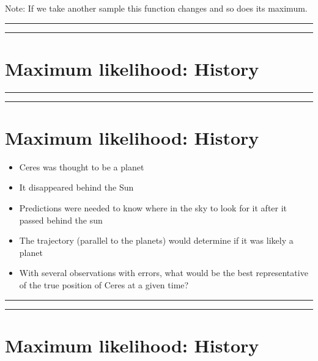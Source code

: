 \documentclass[
]{book}
\begin{document}
Note: If we take another sample this function changes and so does its maximum.

\begin{center}\rule{0.5\linewidth}{0.5pt}\end{center}

\begin{center}\rule{0.5\linewidth}{0.5pt}\end{center}

\hypertarget{maximum-likelihood-history}{%
\section{Maximum likelihood: History}\label{maximum-likelihood-history}}

\begin{center}\rule{0.5\linewidth}{0.5pt}\end{center}

\begin{center}\rule{0.5\linewidth}{0.5pt}\end{center}

\hypertarget{maximum-likelihood-history-1}{%
\section{Maximum likelihood: History}\label{maximum-likelihood-history-1}}

\begin{itemize}
\item
  Ceres was thought to be a planet
\item
  It disappeared behind the Sun
\item
  Predictions were needed to know where in the sky to look for it after it passed behind the sun
\item
  The trajectory (parallel to the planets) would determine if it was likely a planet
\item
  With several observations with errors, what would be the best representative of the true position of Ceres at a given time?
\end{itemize}

\begin{center}\rule{0.5\linewidth}{0.5pt}\end{center}

\begin{center}\rule{0.5\linewidth}{0.5pt}\end{center}

\hypertarget{maximum-likelihood-history-2}{%
\section{Maximum likelihood: History}\label{maximum-likelihood-history-2}}
\end{document}
